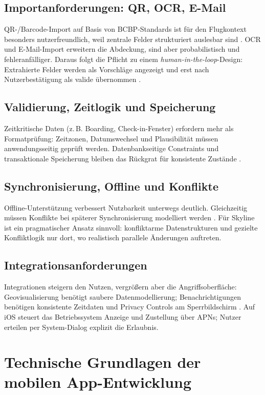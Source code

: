 \subsection{Importanforderungen: QR, OCR, E-Mail}
QR-/Barcode-Import auf Basis von BCBP-Standards ist für den Flugkontext
besonders nutzerfreundlich, weil zentrale Felder strukturiert auslesbar sind
\cite{iataBCBP}. OCR und E-Mail-Import erweitern die Abdeckung, sind aber
probabilistisch und fehleranfälliger. Daraus folgt die Pflicht zu einem
\textit{human-in-the-loop}-Design: Extrahierte Felder werden als Vorschläge
angezeigt und erst nach Nutzerbestätigung als valide übernommen
\cite{mlKitTextRecognition,tesseractOcr}.

\subsection{Validierung, Zeitlogik und Speicherung}
Zeitkritische Daten (z.\,B. Boarding, Check-in-Fenster) erfordern mehr als
Formatprüfung: Zeitzonen, Datumswechsel und Plausibilität müssen
anwendungsseitig geprüft werden. Datenbankseitige Constraints und transaktionale
Speicherung bleiben das Rückgrat für konsistente Zustände
\cite{postgresqlConstraints,postgresqlTxIsolation}.

\subsection{Synchronisierung, Offline und Konflikte}
Offline-Unterstützung verbessert Nutzbarkeit unterwegs deutlich. Gleichzeitig
müssen Konflikte bei späterer Synchronisierung modelliert werden
\cite{firestoreOffline,amplifyConflict}. Für Skyline ist ein pragmatischer Ansatz
sinnvoll: konfliktarme Datenstrukturen und gezielte Konfliktlogik nur dort, wo
realistisch parallele Änderungen auftreten.

\subsection{Integrationsanforderungen}
Integrationen steigern den Nutzen, vergrößern aber die Angriffsoberfläche:
Geovisualisierung benötigt saubere Datenmodellierung; Benachrichtigungen
benötigen konsistente Zeitdaten und Privacy Controls am Sperrbildschirm
\cite{applePushPrimer2020,androidNotifications}. Auf iOS steuert das
Betriebssystem Anzeige und Zustellung über APNs; Nutzer erteilen per
System-Dialog explizit die Erlaubnis.

\section{Technische Grundlagen der mobilen App-Entwicklung}

